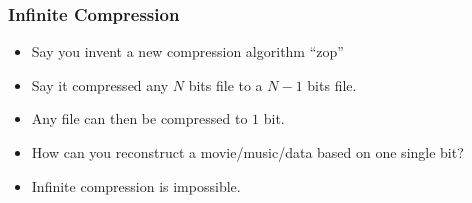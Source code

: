 \documentclass{../ucll-slides}
\begin{document}
\begin{frame}
  \frametitle{Infinite Compression}
  \begin{itemize}
    \item Say you invent a new compression algorithm ``zop''
    \item Say it compressed any $N$ bits file to a $N-1$ bits file.
    \item Any file can then be compressed to $1$ bit.
    \item How can you reconstruct a movie/music/data based on one single bit?
  \end{itemize}
  \begin{center}
  \end{center}
  \begin{itemize}
    \item Infinite compression is impossible.
  \end{itemize}
\end{frame}
\end{document}
